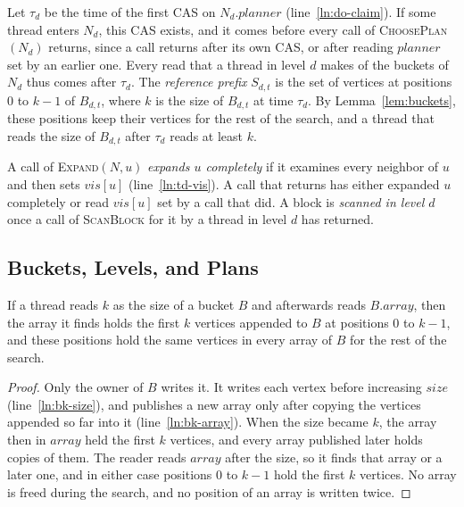 Let $\tau_d$ be the time of the first CAS on $N_d.\mathit{planner}$ (line~\ref{ln:do-claim}). If some thread enters $N_d$, this CAS exists, and it comes before every call of \textsc{ChoosePlan}$(N_d)$ returns, since a call returns after its own CAS, or after reading $\mathit{planner}$ set by an earlier one. Every read that a thread in level $d$ makes of the buckets of $N_d$ thus comes after $\tau_d$. The \emph{reference prefix} $S_{d,t}$ is the set of vertices at positions $0$ to $k-1$ of $B_{d,t}$, where $k$ is the size of $B_{d,t}$ at time $\tau_d$. By Lemma~\ref{lem:buckets}, these positions keep their vertices for the rest of the search, and a thread that reads the size of $B_{d,t}$ after $\tau_d$ reads at least $k$.

A call of \textsc{Expand}$(N, u)$ \emph{expands $u$ completely} if it examines every neighbor of $u$ and then sets $\mathit{vis}[u]$ (line~\ref{ln:td-vis}). A call that returns has either expanded $u$ completely or read $\mathit{vis}[u]$ set by a call that did. A block is \emph{scanned in level $d$} once a call of \textsc{ScanBlock} for it by a thread in level $d$ has returned.

\subsection{Buckets, Levels, and Plans}
\label{sec:pf-structures}

\begin{lemma}[Buckets]
\label{lem:buckets}
If a thread reads $k$ as the size of a bucket $B$ and afterwards reads $B.\mathit{array}$, then the array it finds holds the first $k$ vertices appended to $B$ at positions $0$ to $k-1$, and these positions hold the same vertices in every array of $B$ for the rest of the search.
\end{lemma}
\begin{proof}
Only the owner of $B$ writes it. It writes each vertex before increasing $\mathit{size}$ (line~\ref{ln:bk-size}), and publishes a new array only after copying the vertices appended so far into it (line~\ref{ln:bk-array}). When the size became $k$, the array then in $\mathit{array}$ held the first $k$ vertices, and every array published later holds copies of them. The reader reads $\mathit{array}$ after the size, so it finds that array or a later one, and in either case positions $0$ to $k-1$ hold the first $k$ vertices. No array is freed during the search, and no position of an array is written twice.
\end{proof}

